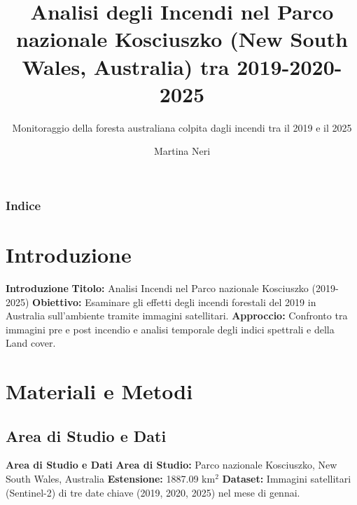 \documentclass{beamer}
\title{\textbf{\textcolor{verdeScuro}{Analisi degli Incendi nel Parco nazionale Kosciuszko (New South Wales, Australia) tra 2019-2020-2025}}}
\subtitle{Monitoraggio della foresta australiana colpita dagli incendi tra il 2019 e il 2025}
\author{Martina Neri}
\begin{document}
\maketitle

\begin{frame}
\frametitle{Indice}
\tableofcontents
\end{frame}

\section{Introduzione}

\begin{frame}{\textbf{Introduzione}}
\textbf{Titolo:} Analisi Incendi nel Parco nazionale Kosciuszko (2019-2025)
\newline
\newline
\textbf{Obiettivo:} Esaminare gli effetti degli incendi forestali del 2019 in Australia sull'ambiente tramite immagini satellitari.
\newline
\newline
\textbf{Approccio:} Confronto tra immagini pre e post incendio e analisi temporale degli indici spettrali e della Land cover.
\end{frame}

\section{Materiali e Metodi}

\subsection{Area di Studio e Dati}

\begin{frame}{\textbf{Area di Studio e Dati}}
\textbf{Area di Studio:} Parco nazionale Kosciuszko, New South Wales, Australia
\newline
\newline
\textbf{Estensione:} 1887.09 km\(^2\)
\newline
\newline
\textbf{Dataset:} Immagini satellitari (Sentinel-2) di tre date chiave (2019, 2020, 2025) nel mese di gennai.
\end{frame}
\end{document}
